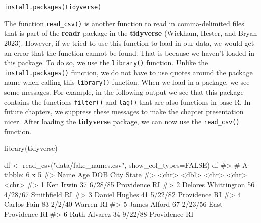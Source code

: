 \documentclass[
  letterpaper,
]{latex/krantz}
\makeatletter
\newenvironment{Shaded}{\begin{snugshade}}{\end{snugshade}}
\newcommand{\AttributeTok}[1]{\textcolor[rgb]{0.40,0.45,0.13}{#1}}
\newcommand{\CommentTok}[1]{\textcolor[rgb]{0.37,0.37,0.37}{#1}}
\newcommand{\ConstantTok}[1]{\textcolor[rgb]{0.56,0.35,0.01}{#1}}
\newcommand{\FunctionTok}[1]{\textcolor[rgb]{0.28,0.35,0.67}{#1}}
\newcommand{\NormalTok}[1]{\textcolor[rgb]{0.00,0.23,0.31}{#1}}
\newcommand{\OtherTok}[1]{\textcolor[rgb]{0.00,0.23,0.31}{#1}}
\newcommand{\StringTok}[1]{\textcolor[rgb]{0.13,0.47,0.30}{#1}}
\newenvironment{kframe}{%
\medskip{}
\setlength{\fboxsep}{.8em}
 \def\at@end@of@kframe{}%
 \ifinner\ifhmode%
  \def\at@end@of@kframe{\end{minipage}}%
  \begin{minipage}{\columnwidth}%
 \fi\fi%
 \def\FrameCommand##1{\hskip\@totalleftmargin \hskip-\fboxsep
 \colorbox{shadecolor}{##1}\hskip-\fboxsep
     \hskip-\linewidth \hskip-\@totalleftmargin \hskip\columnwidth}%
 \MakeFramed {\advance\hsize-\width
   \@totalleftmargin\z@ \linewidth\hsize
   \@setminipage}}%
 {\par\unskip\endMakeFramed%
 \at@end@of@kframe}
\renewenvironment{Shaded}{\begin{kframe}}{\end{kframe}}
\makeatother
\begin{document}
\texttt{install.packages(\textquotesingle{}tidyverse\textquotesingle{})}

The function
\texttt{read\_csv()}
is another function to read in comma-delimited files that is part of the
\textbf{readr} package in the \textbf{tidyverse}
(Wickham, Hester, and Bryan 2023). However, if we tried to use this
function to load in our data, we would get an error that the function
cannot be found. That is because we haven't loaded in this package. To
do so, we use the
\texttt{library()}
function. Unlike the \texttt{install.packages()} function, we do not
have to use quotes around the package name when calling this
\texttt{library()} function. When we load in a package, we see some
messages. For example, in the following output we see that this package
contains the functions \texttt{filter()} and \texttt{lag()} that are
also functions in base R. In future chapters, we suppress these messages
to make the chapter presentation nicer. After loading the
\textbf{tidyverse} package, we can now use the \texttt{read\_csv()}
function.

\begin{Shaded}
\begin{Highlighting}[]
\FunctionTok{library}\NormalTok{(tidyverse)}
\end{Highlighting}
\end{Shaded}

\begin{Shaded}
\begin{Highlighting}[]
\NormalTok{df }\OtherTok{\textless{}{-}} \FunctionTok{read\_csv}\NormalTok{(}\StringTok{"data/fake\_names.csv"}\NormalTok{, }\AttributeTok{show\_col\_types=}\ConstantTok{FALSE}\NormalTok{)}
\NormalTok{df}
\CommentTok{\#\textgreater{} \# A tibble: 6 x 5}
\CommentTok{\#\textgreater{}   Name                  Age DOB     City            State}
\CommentTok{\#\textgreater{}   \textless{}chr\textgreater{}               \textless{}dbl\textgreater{} \textless{}chr\textgreater{}   \textless{}chr\textgreater{}           \textless{}chr\textgreater{}}
\CommentTok{\#\textgreater{} 1 Ken Irwin              37 6/28/85 Providence      RI   }
\CommentTok{\#\textgreater{} 2 Delores Whittington    56 4/28/67 Smithfield      RI   }
\CommentTok{\#\textgreater{} 3 Daniel Hughes          41 5/22/82 Providence      RI   }
\CommentTok{\#\textgreater{} 4 Carlos Fain            83 2/2/40  Warren          RI   }
\CommentTok{\#\textgreater{} 5 James Alford           67 2/23/56 East Providence RI   }
\CommentTok{\#\textgreater{} 6 Ruth Alvarez           34 9/22/88 Providence      RI}
\end{Highlighting}
\end{Shaded}
\end{document}

